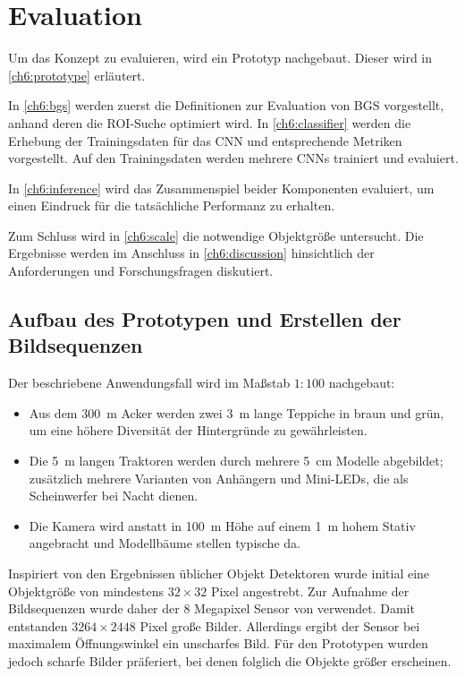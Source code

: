 \chapter{Evaluation} \label{ch:eval}
Um das Konzept zu evaluieren, wird ein Prototyp nachgebaut.
Dieser wird in \autoref{ch6:prototype} erläutert.

In \autoref{ch6:bgs} werden zuerst die Definitionen zur Evaluation von \ac{BGS} vorgestellt, anhand deren die \ac{ROI}-Suche optimiert wird.
In \autoref{ch6:classifier} werden die Erhebung der Trainingsdaten für das \ac{CNN} und entsprechende Metriken vorgestellt.
Auf den Trainingsdaten werden mehrere \acp{CNN} trainiert und evaluiert.

In \autoref{ch6:inference} wird das Zusammenspiel beider Komponenten evaluiert, um einen Eindruck für die tatsächliche Performanz zu erhalten.

Zum Schluss wird in \autoref{ch6:scale} die notwendige Objektgröße untersucht.
Die Ergebnisse werden im Anschluss in \autoref{ch6:discussion} hinsichtlich der Anforderungen und Forschungsfragen diskutiert.


\section{Aufbau des Prototypen und Erstellen der Bildsequenzen} \label{ch6:prototype}
\label{ch4:masstab}
Der beschriebene Anwendungsfall wird im Maßstab $1:100$ nachgebaut:

\begin{itemize}
    \item Aus dem \SI{300}{\metre} Acker werden zwei \SI{3}{\metre} lange Teppiche in braun und grün, um eine höhere Diversität der Hintergründe zu gewährleisten.

    \item Die \SI{5}{\metre} langen Traktoren werden durch mehrere \SI{5}{\centi\metre} Modelle abgebildet; zusätzlich mehrere Varianten von Anhängern und Mini-LEDs, die als Scheinwerfer bei Nacht dienen.

    \item Die Kamera wird anstatt in \SI{100}{\metre} Höhe auf einem \SI{1}{\metre} hohem Stativ angebracht und Modellbäume stellen typische  da.
\end{itemize}

Inspiriert von den Ergebnissen üblicher Objekt Detektoren wurde initial eine Objektgröße von mindestens $32 \times 32$ Pixel angestrebt.
Zur Aufnahme der Bildsequenzen wurde daher der 8 Megapixel  Sensor von  verwendet.
Damit entstanden $3264 \times 2448$ Pixel große Bilder.
Allerdings ergibt der Sensor bei maximalem Öffnungswinkel ein unscharfes Bild.
Für den Prototypen wurden jedoch scharfe Bilder präferiert, bei denen folglich die Objekte größer erscheinen.

